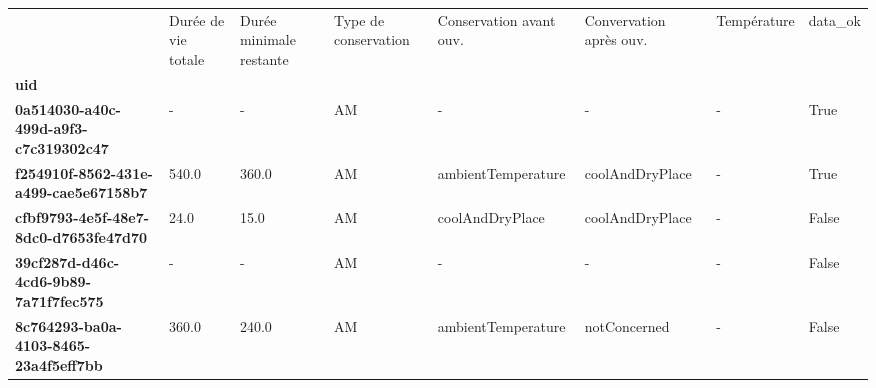 \begin{tabularx}{\linewidth}{lXXXXXXX}
\toprule
{} &  Durée de vie totale &  Durée minimale restante & Type de conservation & Conservation avant ouv. & Convervation après ouv. & Température &  data\_ok \\
\textbf{uid                                 } &                      &                          &                      &                         &                         &             &          \\
\midrule
\textbf{0a514030-a40c-499d-a9f3-c7c319302c47} &                    - &                        - &                   AM &                       - &                       - &           - &     True \\
\textbf{f254910f-8562-431e-a499-cae5e67158b7} &                540.0 &                    360.0 &                   AM &      ambientTemperature &         coolAndDryPlace &           - &     True \\
\textbf{cfbf9793-4e5f-48e7-8dc0-d7653fe47d70} &                 24.0 &                     15.0 &                   AM &         coolAndDryPlace &         coolAndDryPlace &           - &    False \\
\textbf{39cf287d-d46c-4cd6-9b89-7a71f7fec575} &                    - &                        - &                   AM &                       - &                       - &           - &    False \\
\textbf{8c764293-ba0a-4103-8465-23a4f5eff7bb} &                360.0 &                    240.0 &                   AM &      ambientTemperature &            notConcerned &           - &    False \\
\bottomrule
\end{tabularx}
